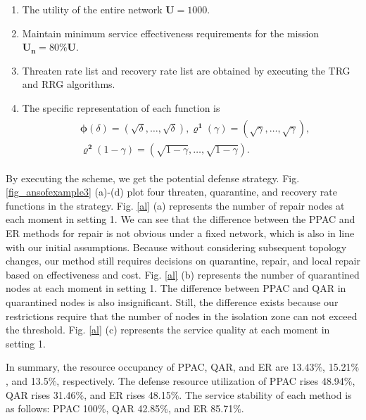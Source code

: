 \documentclass[lettersize,journal]{IEEEtran}
\begin{document}
  \begin{enumerate}
	\item The utility of the entire network $\bm{U}=1000$.
	\item Maintain minimum service effectiveness requirements for the mission $\bm{U_n} = 80\% \bm{U}$.
	\item Threaten rate list and recovery rate list are obtained by executing the TRG and RRG algorithms.
	\item The specific representation of each function is
        \begin{equation}
        \begin{aligned}
        \begin{aligned}
        &\boldsymbol{\phi}(\delta) =(\sqrt{\delta}, \ldots, \sqrt{\delta}),  \boldsymbol{\varrho^1}(\gamma) =\left(\sqrt{\gamma}, \ldots, \sqrt{\gamma}\right),
        \\
        &\boldsymbol{\varrho^2}(1-\gamma) =(\sqrt{1-\gamma}, \ldots, \sqrt{1-\gamma}).
        \end{aligned}\nonumber
    	\end{aligned}
    	\end{equation}
\end{enumerate}
\par

By executing the scheme, we get the potential defense strategy. Fig. \ref{fig_ansofexample3} (a)-(d) plot four threaten, quarantine, and recovery rate functions in the strategy. Fig. \ref{al} (a) represents the number of repair nodes at each moment in setting 1. We can see that the difference between the PPAC and ER methods for repair is not obvious under a fixed network, which is also in line with our initial assumptions. Because without considering subsequent topology changes, our method still requires decisions on quarantine, repair, and local repair based on effectiveness and cost. Fig. \ref{al} (b) represents the number of quarantined nodes at each moment in setting 1. The difference between PPAC and QAR in quarantined nodes is also insignificant. Still, the difference exists because our restrictions require that the number of nodes in the isolation zone can not exceed the threshold. Fig. \ref{al} (c) represents the service quality at each moment in setting 1. \par




In summary, the resource occupancy of PPAC, QAR, and ER are  13.43$\%$, 15.21$\%$, and 13.5$\%$, respectively. The defense resource utilization of PPAC rises 48.94$\%$, QAR rises 31.46$\%$, and ER rises 48.15$\%$. The service stability of each method is as follows: PPAC 100$\%$, QAR 42.85$\%$, and ER 85.71$\%$.  
\end{document}

